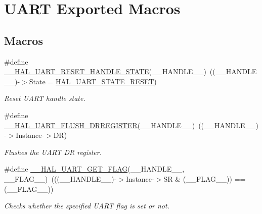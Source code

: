 \hypertarget{group___u_a_r_t___exported___macros}{}\section{U\+A\+RT Exported Macros}
\label{group___u_a_r_t___exported___macros}
\subsection*{Macros}
\begin{DoxyCompactItemize}
\item 
\#define \hyperlink{group___u_a_r_t___exported___macros_ga19deab848407b106998416c78092fa9b}{\+\_\+\+\_\+\+H\+A\+L\+\_\+\+U\+A\+R\+T\+\_\+\+R\+E\+S\+E\+T\+\_\+\+H\+A\+N\+D\+L\+E\+\_\+\+S\+T\+A\+TE}(\+\_\+\+\_\+\+H\+A\+N\+D\+L\+E\+\_\+\+\_\+)~((\+\_\+\+\_\+\+H\+A\+N\+D\+L\+E\+\_\+\+\_\+)-\/$>$State = \hyperlink{group___u_a_r_t___exported___types_ggaf55d844a35379c204c90be5d1e8e50baa9c7d889fce61ccc717228d099a61d113}{H\+A\+L\+\_\+\+U\+A\+R\+T\+\_\+\+S\+T\+A\+T\+E\+\_\+\+R\+E\+S\+ET})
\begin{DoxyCompactList}\small\item\em Reset U\+A\+RT handle state. \end{DoxyCompactList}\item 
\#define \hyperlink{group___u_a_r_t___exported___macros_gafc4f20cb0f29ba146c9bc14167c52744}{\+\_\+\+\_\+\+H\+A\+L\+\_\+\+U\+A\+R\+T\+\_\+\+F\+L\+U\+S\+H\+\_\+\+D\+R\+R\+E\+G\+I\+S\+T\+ER}(\+\_\+\+\_\+\+H\+A\+N\+D\+L\+E\+\_\+\+\_\+)~((\+\_\+\+\_\+\+H\+A\+N\+D\+L\+E\+\_\+\+\_\+)-\/$>$Instance-\/$>$DR)
\begin{DoxyCompactList}\small\item\em Flushes the U\+A\+RT DR register. \end{DoxyCompactList}\item 
\#define \hyperlink{group___u_a_r_t___exported___macros_ga261fe8a2afe84ec048113654266c5bf6}{\+\_\+\+\_\+\+H\+A\+L\+\_\+\+U\+A\+R\+T\+\_\+\+G\+E\+T\+\_\+\+F\+L\+AG}(\+\_\+\+\_\+\+H\+A\+N\+D\+L\+E\+\_\+\+\_\+,  \+\_\+\+\_\+\+F\+L\+A\+G\+\_\+\+\_\+)~(((\+\_\+\+\_\+\+H\+A\+N\+D\+L\+E\+\_\+\+\_\+)-\/$>$Instance-\/$>$SR \& (\+\_\+\+\_\+\+F\+L\+A\+G\+\_\+\+\_\+)) == (\+\_\+\+\_\+\+F\+L\+A\+G\+\_\+\+\_\+))
\begin{DoxyCompactList}\small\item\em Checks whether the specified U\+A\+RT flag is set or not. \end{DoxyCompactList}\item 

\end{DoxyCompactItemize}

